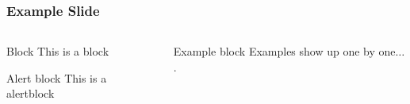 \documentclass[10pt,usepdftitle=false,aspectratio=169]{beamer}
\begin{document}
\begin{frame}[fragile]
	\frametitle{Example Slide}
	\begin{columns}
		\begin{column}{.5\columnwidth}
			\begin{block}{Block}
				This is a block
			\end{block}
			\begin{alertblock}{Alert block}
				This is a alertblock
			\end{alertblock}
		\end{column}
		\begin{column}{.5\columnwidth}
			\begin{exampleblock}{Example block}
				Examples show up one by one$\dots$.
				\begin{itemize}
				\end{itemize}
			\end{exampleblock}
		\end{column}
	\end{columns}
\end{frame}
\end{document}
